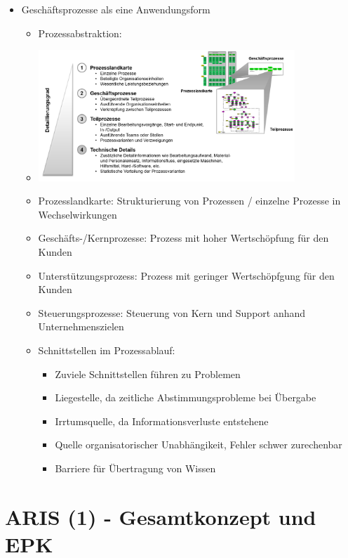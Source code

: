\documentclass[11pt,a4paper]{article}
\begin{document}
\begin{itemize}
\item Geschäftsprozesse als eine Anwendungsform
	\begin{itemize}
	\item Prozessabstraktion:
	\item[] \includegraphics[width=0.8\textwidth]{prozessabstraktion}	
	\item Prozesslandkarte: Strukturierung von Prozessen / einzelne Prozesse in Wechselwirkungen
	\item Geschäfts-/Kernprozesse: Prozess mit hoher Wertschöpfung für den Kunden
	\item Unterstützungsprozess: Prozess mit geringer Wertschöpfgung für den Kunden 
	\item Steuerungsprozesse: Steuerung von Kern und Support anhand Unternehmenszielen
	\item Schnittstellen im Prozessablauf:
		\begin{itemize}
		\item Zuviele Schnittstellen führen zu Problemen
		\item Liegestelle, da zeitliche Abstimmungsprobleme bei Übergabe
		\item Irrtumsquelle, da Informationsverluste entstehene
		\item Quelle organisatorischer Unabhängikeit, Fehler schwer zurechenbar
		\item Barriere für Übertragung von Wissen
		\end{itemize}
	\end{itemize}
\end{itemize}

\section{ARIS (1) - Gesamtkonzept und EPK}
\end{document}

